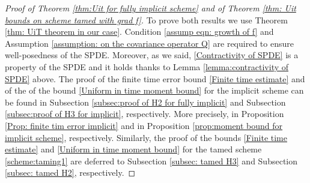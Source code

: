 \documentclass[reqno, 11pt]{amsart}
\theoremstyle{plain}
\theoremstyle{definition}
\theoremstyle{remark}
\numberwithin{equation}{section}
\numberwithin{theorem}{section}
\begin{document}
{\begin{proof}[Proof of Theorem \ref{thm:Uit for fully implicit scheme} and of  Theorem \ref{thm: Uit bounds on scheme tamed with grad f}]
    To prove both results we use Theorem \ref{thm: UiT theorem in our case}. Condition \eqref{assump eqn: growth of f} and Assumption \ref{assumption: on the covariance operator Q} are required to ensure well-posedness of the SPDE. Moreover,  as we said, \ref{Contractivity of SPDE} is a property of the SPDE and it holds thanks to Lemma \ref{lemma:contractivity of SPDE} above. 
    The proof of the finite time error bound \ref{Finite time estimate} and of the of the bound \ref{Uniform in time moment bound} for the implicit scheme can be found in Subsection \ref{subsec:proof of H2 for fully implicit} and Subsection \ref{subsec:proof of H3 for implicit}, respectively. More precisely,  in Proposition \ref{Prop: finite tim error implicit} and  in Proposition \ref{prop:moment bound for implicit scheme}, respectively. 
    Similarly, the proof of the bounds \ref{Finite time estimate} and \ref{Uniform in time moment bound}  for the tamed scheme \eqref{scheme:taming1} are deferred to Subsection \ref{subsec: tamed H3} and Subsection \ref{subsec: tamed H2}, respectively. 
\end{proof}

}
\end{document}
